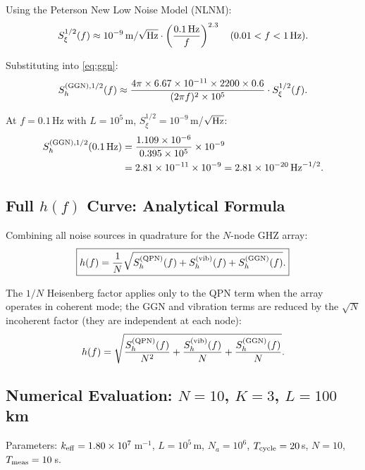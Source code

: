 \documentclass[11pt]{article}
\theoremstyle{definition}
\theoremstyle{remark}
\begin{document}
Using the Peterson New Low Noise Model (NLNM):
\begin{equation}
S_\xi^{1/2}(f) \approx 10^{-9}\,{\rm m}/\sqrt{\rm Hz}
\cdot \left(\frac{0.1\,\rm Hz}{f}\right)^{2.3}
\quad (0.01 < f < 1\,{\rm Hz}).
\label{eq:nlnm}
\end{equation}

Substituting into \eqref{eq:ggn}:
\begin{equation}
S_h^{(\rm GGN),1/2}(f)
\approx \frac{4\pi \times 6.67\times10^{-11} \times 2200 \times 0.6}
{(2\pi f)^2 \times 10^5}
\cdot S_\xi^{1/2}(f).
\end{equation}

At $f = 0.1$\,Hz with $L = 10^5$\,m, $S_\xi^{1/2} = 10^{-9}$\,m/$\sqrt{\rm Hz}$:
\begin{align}
S_h^{(\rm GGN),1/2}(0.1\,\rm Hz)
&= \frac{1.109\times10^{-6}}{0.395 \times 10^5} \times 10^{-9} \notag \\
&= 2.81\times10^{-11} \times 10^{-9}
= 2.81\times10^{-20}\,\mathrm{Hz}^{-1/2}.
\end{align}

\subsection{Full $h(f)$ Curve: Analytical Formula}

Combining all noise sources in quadrature for the $N$-node GHZ array:
\begin{equation}
\boxed{
h(f) = \frac{1}{N} \sqrt{
S_h^{(\rm QPN)}(f)
+ S_h^{(\rm vib)}(f)
+ S_h^{(\rm GGN)}(f)
}.
}
\label{eq:full-hf}
\end{equation}

The $1/N$ Heisenberg factor applies only to the QPN term when the array
operates in coherent mode; the GGN and vibration terms are reduced by the
$\sqrt{N}$ incoherent factor (they are independent at each node):
\begin{equation}
h(f) = \sqrt{
\frac{S_h^{(\rm QPN)}(f)}{N^2}
+ \frac{S_h^{(\rm vib)}(f)}{N}
+ \frac{S_h^{(\rm GGN)}(f)}{N}
}.
\label{eq:full-hf-correct}
\end{equation}

\subsection{Numerical Evaluation: $N=10$, $K=3$, $L=100$\,km}

Parameters: $k_{\rm eff} = 1.80\times10^7$\,m$^{-1}$, $L = 10^5$\,m,
$N_a = 10^6$, $T_{\rm cycle} = 20$\,s, $N = 10$, $T_{\rm meas} = 10$\,s.
\end{document}
